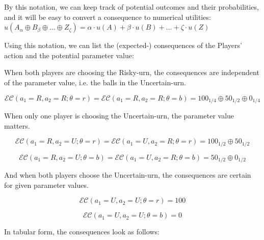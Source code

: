 \documentclass{article}
\theoremstyle{definition}
\begin{document}
By this notation, we can keep track of potential outcomes and their probabilities, and it will be easy to convert a consequence to numerical utilities:
$u(A_{\alpha} \oplus B_\beta \oplus \dots \oplus Z_\zeta)= \alpha \cdot u(A) + \beta \cdot u(B) + \dots + \zeta \cdot u(Z)$

Using this notation, we can list the (expected-) consequences of the Players' action and the potential parameter value:

When both players are choosing the Risky-urn, the consequences are independent of the parameter value, i.e. the balls in the Uncertain-urn.

\begin{equation}
    \mathcal{EC}(a_1=R,a_2=R;\theta=r) 
    =
    \mathcal{EC}(a_1=R,a_2=R;\theta=b) 
    =
    100_{1/4} \oplus 50_{1/2} \oplus 0_{1/4}
\end{equation}

When only one player is choosing the Uncertain-urn, the parameter value matters.

\begin{equation}
    \mathcal{EC}(a_1=R,a_2=U;\theta=r) 
    =
    \mathcal{EC}(a_1=U,a_2=R;\theta=r) 
    =
    100_{1/2} \oplus 50_{1/2}
\end{equation}

\begin{equation}
    \mathcal{EC}(a_1=R,a_2=U;\theta=b) 
    =
    \mathcal{EC}(a_1=U,a_2=R;\theta=b) 
    =
    50_{1/2} \oplus 0_{1/2}
\end{equation}

And when both players choose the Uncertain-urn, the consequences are certain for given parameter values.

\begin{equation}
    \mathcal{EC}(a_1=U,a_2=U;\theta=r) 
    =
    100
\end{equation}

\begin{equation}
    \mathcal{EC}(a_1=U,a_2=U;\theta=b) 
    =
    0
\end{equation}

In tabular form, the consequences look as follows:
\end{document}
